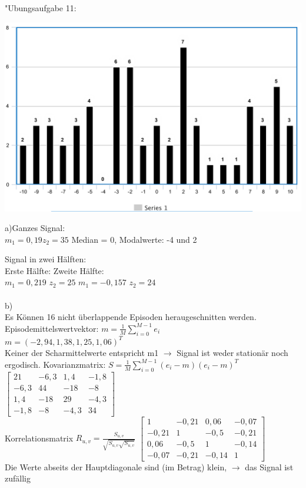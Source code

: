 \documentclass[fleqn,a4paper,12pt]{article}
\begin{document}
	"Ubungsaufgabe 11:\newline
	
	\includegraphics[scale=0.4]{A11_Histo.png}
	
	a)Ganzes Signal:\\
	$m_1 = 0,19		z_2 = 35$ \hspace{1cm}
	Median = 0,	Modalwerte: -4 und 2
	
	Signal in zwei H\"alften:\\
	Erste H\"alfte:	\hspace{5cm}										Zweite H\"alfte:\\
	$m_1 = 0,219$  $z_2 = 25$	\hspace{4cm}								$m_1 = -0,157$  $z_2 = 24$\\
	\\
	b)\\
	Es K\"onnen 16 nicht \"uberlappende Episoden heraugeschnitten werden.
	Episodemittelswertvektor: $m = \frac{1}{M}\sum_{i=0}^{M-1}e_i$\\
	$m = (-2,94, 1,38, 1,25, 1,06)^T$\\
	Keiner der Scharmittelwerte entspricht m1 $\rightarrow$ Signal ist weder station\"ar noch ergodisch.
	\newpage
	Kovarianzmatrix: $S = \frac{1}{M}\sum_{i=0}^{M-1}(e_i-m)(e_i-m)^T$\\
	$
	\begin{bmatrix}
	21   & -6,3 & 1,4	 &  -1,8 \\
	-6,3 & 44 	& -18	 &  -8 \\
	1,4  & -18	& 29 	 & -4,3 \\
	-1,8 & -8 	& -4,3	 &  34
	\end{bmatrix}
	$\\
	Korrelationsmatrix $R_{u,v} = \frac{S_{u,v}}{\sqrt{S_{u,v} \sqrt{S_{u,v}}}}$
	$
	\begin{bmatrix}
	1   & -0,21 & 0,06	 &  -0,07 \\
	-0,21 & 1 	& -0,5	 &  -0,21 \\
	0,06  & -0,5	& 1 	 & -0,14 \\
	-0,07 & -0,21 	& -0,14	 &  1
	\end{bmatrix}
	$\\Die Werte abseits der Hauptdiagonale sind (im Betrag) klein, $\rightarrow$ das Signal ist zuf\"allig\\
\end{document}
